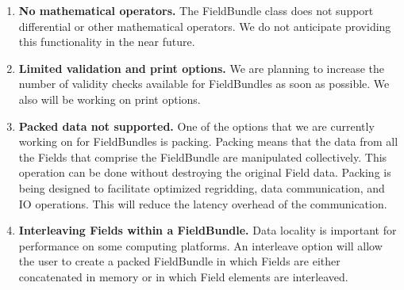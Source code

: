 
\label{sec:bundlerest}

\begin{enumerate}
\item{\bf No mathematical operators.}
The FieldBundle class does not support differential or other
mathematical operators.  We do not anticipate providing this 
functionality in the near future.

\item{\bf Limited validation and print options.}
We are planning to increase the number of validity checks available
for FieldBundles as soon as possible.  We also will
be working on print options.

\item{\bf Packed data not supported.}
One of the options that we are currently working on for FieldBundles is
packing.  Packing means that the data from all the
Fields that comprise the FieldBundle are manipulated collectively.
This operation can be done without 
destroying the original Field data.  Packing is being designed to 
facilitate optimized regridding, data communication, and IO operations.  
This will reduce the latency overhead of the communication.  

\item{\bf Interleaving Fields within a FieldBundle.}
Data locality is important for performance on some computing
platforms.  An interleave option will allow the user to create
a packed FieldBundle in which Fields are either concatenated in memory
or in which Field elements are interleaved.

\end{enumerate}




